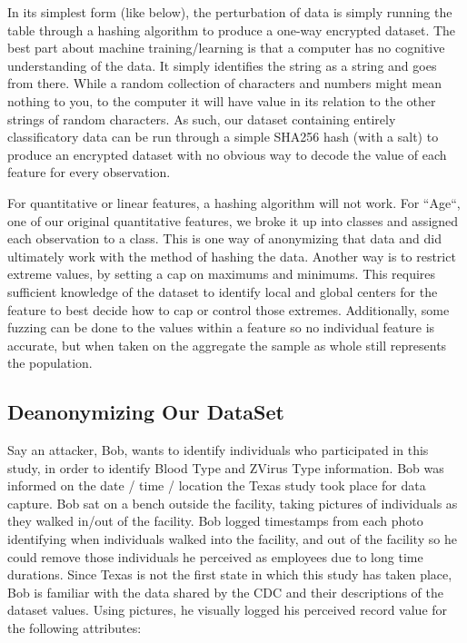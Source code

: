 \documentclass[10pt,journal,compsoc]{IEEEtran}
\begin{document}
In its simplest form (like below), the perturbation of data is simply running the table through a hashing algorithm to produce a one-way encrypted dataset. The best part about machine training/learning is that a computer has no cognitive understanding of the data. It simply identifies the string as a string and goes from there. While a random collection of characters and numbers might mean nothing to you, to the computer it will have value in its relation to the other strings of random characters. As such, our dataset containing entirely classificatory data can be run through a simple SHA256 hash (with a salt) to produce an encrypted dataset with no obvious way to decode the value of each feature for every observation.

For quantitative or linear features, a hashing algorithm will not work. For ``Age``, one of our original quantitative features, we broke it up into classes and assigned each observation to a class. This is one way of anonymizing that data and did ultimately work with the method of hashing the data. Another way is to restrict extreme values, by setting a cap on maximums and minimums. This requires sufficient knowledge of the dataset to identify local and global centers for the feature to best decide how to cap or control those extremes. Additionally, some fuzzing can be done to the values within a feature so no individual feature is accurate, but when taken on the aggregate the sample as whole still represents the population.

\subsection{Deanonymizing Our DataSet}
Say an attacker, Bob, wants to identify individuals who participated in this study, in order to identify Blood Type and ZVirus Type information. Bob was informed on the date / time / location the Texas study took place for data capture. Bob sat on a bench outside the facility, taking pictures of individuals as they walked in/out of the facility. Bob logged timestamps from each photo identifying when individuals walked into the facility, and out of the facility so he could remove those individuals he perceived as employees due to long time durations.
Since Texas is not the first state in which this study has taken place, Bob is familiar with the data shared by the CDC and their descriptions of the dataset values. Using pictures, he visually logged his perceived record value for the following attributes:
\end{document}
